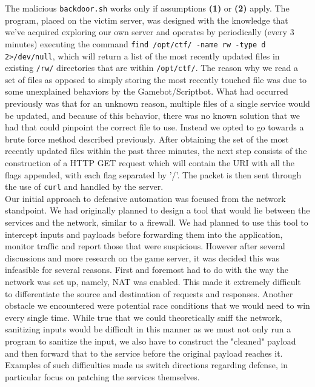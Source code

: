 \documentclass[12pt]{report}
\begin{document}
\noindent The malicious \texttt{backdoor.sh} works only if assumptions \textbf{(1)} or \textbf{(2)} apply. The program, placed on the victim server, was designed with the knowledge that we've acquired exploring our own server and operates by periodically (every 3 minutes) executing the command \texttt{find /opt/ctf/ -name rw -type d 2>/dev/null}, which will return a list of the most recently updated files in existing \texttt{/rw/} directories that are within \texttt{/opt/ctf/}. The reason why we read a set of files as opposed to simply storing the most recently touched file was due to some unexplained behaviors by the Gamebot/Scriptbot. What had occurred previously was that for an unknown reason, multiple files of a single service would be updated, and because of this behavior, there was no known solution that we had that could pinpoint the correct file to use. Instead we opted to go towards a brute force method described previously. After obtaining the set of the most recently updated files within the past three minutes, the next step consists of the construction of a HTTP GET request which will contain the URI with all the flags appended, with each flag separated by '/'. The packet is then sent through the use of \texttt{curl} and handled by the server.\\

\noindent Our initial approach to defensive automation was focused from the network standpoint. We had originally planned to design a tool that would lie between the services and the network, similar to a firewall. We had planned to use this tool to intercept inputs and payloads before forwarding them into the application, monitor traffic and report those that were suspicious. However after several discussions and more research on the game server, it was decided this was infeasible for several reasons. First and foremost had to do with the way the network was set up, namely, NAT was enabled. This made it extremely difficult to differentiate the source and destination of requests and responses. Another obstacle we encountered were potential race conditions that we would need to win every single time. While true that we could theoretically sniff the network, sanitizing inputs would be difficult in this manner as we must not only run a program to sanitize the input, we also have to construct the "cleaned" payload and then forward that to the service before the original payload reaches it. Examples of such difficulties made us switch directions regarding defense, in particular focus on patching the services themselves. \\
\end{document}

